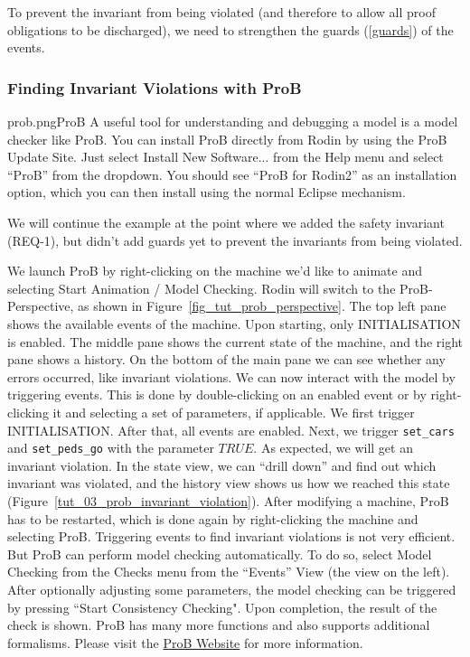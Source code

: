 To prevent the invariant from being violated (and therefore to allow all proof obligations to be discharged), we need to strengthen the guards (\ref{guards}) of the events.


\subsubsection{Finding Invariant Violations with ProB}
\label{tut:prob}
\begin{rodin-plugin}{prob.png}{ProB}
A useful tool for understanding and debugging a model is a model checker like ProB. You can install ProB directly from Rodin by using the ProB Update Site.  Just select \textsf{Install New Software...} from the \textsf{Help} menu and select ``ProB'' from the dropdown. You should see ``ProB for Rodin2'' as an installation option, which you can then install using the normal Eclipse mechanism. 

We will continue the example at the point where we added the safety invariant (REQ-1), but didn't add guards yet to prevent the invariants from being violated.

We launch ProB by right-clicking on the machine we'd like to animate and selecting \textsf{Start Animation / Model Checking}.  Rodin will switch to the ProB-Perspective, as shown in Figure~\ref{fig_tut_prob_perspective}. The top left pane shows the available events of the machine.  Upon starting, only INITIALISATION is enabled.  The middle pane shows the current state of the machine, and the right pane shows a history.  On the bottom of the main pane we can see whether any errors occurred, like invariant violations. We can now interact with the model by triggering events.  This is done by double-clicking on an enabled event or by right-clicking it and selecting a set of parameters, if applicable.  We first trigger INITIALISATION.  After that, all events are enabled.  Next, we trigger \texttt{set\_cars} and \texttt{set\_peds\_go}  with the parameter $TRUE$.  As expected, we will get an invariant violation.  In the state view, we can ``drill down'' and find out which invariant was violated, and the history view shows us how we reached this state (Figure~\ref{tut_03_prob_invariant_violation}). After modifying a machine, ProB has to be restarted, which is done again by right-clicking the machine and selecting ProB.  Triggering events to find invariant violations is not very efficient.  But ProB can perform model checking automatically.  To do so, select \textsf{Model Checking} from the \textsf{Checks} menu from the ``Events'' View (the view on the left).  After optionally adjusting some parameters, the model checking can be triggered by pressing ``Start Consistency Checking".  Upon completion, the result of the check is shown. ProB has many more functions and also supports additional formalisms. Please visit the \href{https://prob.hhu.de/}{ProB Website} for more information.

\end{rodin-plugin}

